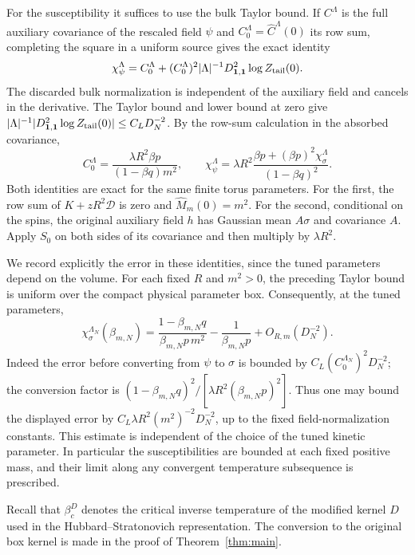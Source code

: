 \documentclass[11pt]{article}
\begin{document}
For the susceptibility it suffices to use the bulk Taylor bound.
If \(C^\Lambda\) is the full auxiliary covariance of the rescaled
field \(\psi\) and \(C_0^\Lambda=\widehat C^\Lambda(0)\) its row
sum, completing the square in a uniform source gives the exact
identity
\[
 \chi_\psi^\Lambda=C_0^\Lambda+
       (C_0^\Lambda)^2 |\Lambda|^{-1}
       D^2_{\boldsymbol1,\boldsymbol1}\log Z_{\rm tail}(0).
\]
The discarded bulk normalization is independent of the auxiliary
field and cancels in the derivative. The Taylor bound and lower
bound at zero give
\(|\Lambda|^{-1}|D^2_{\boldsymbol1,\boldsymbol1}\log Z_{\rm tail}(0)|
 \le C_L D_N^{-2}\).
By the row-sum calculation in the absorbed covariance,
\[
 C_0^\Lambda
 = \frac{\lambda R^2\beta p}{(1-\beta q)m^2},
 \qquad
 \chi_\psi^\Lambda
 =\lambda R^2\frac{\beta p+(\beta p)^2\chi_\sigma^\Lambda}
                    {(1-\beta q)^2}.
\]
Both identities are exact for the same finite torus parameters.
For the first, the row sum of \(K+zR^2\mathcal D\) is zero and
\(\widehat M_m(0)=m^2\). For the second, conditional on the spins,
the original auxiliary field \(h\) has Gaussian mean \(A\sigma\)
and covariance \(A\). Apply \(S_0\) on both sides of its covariance
and then multiply by \(\lambda R^2\).

We record explicitly the error in these identities, since the tuned
parameters depend on the volume. For each fixed \(R\) and \(m^2>0\),
the preceding Taylor bound is uniform over the compact physical
parameter box. Consequently, at the tuned parameters,
\begin{equation}\label{eq:finite-suscept-error}
 \chi_\sigma^{\Lambda_N}(\beta_{m,N})
 =\frac{1-\beta_{m,N}q}{\beta_{m,N}p\,m^2}
       -\frac1{\beta_{m,N}p}
       +O_{R,m}(D_N^{-2}).
\end{equation}
Indeed the error before converting from \(\psi\) to \(\sigma\)
is bounded by \(C_L(C_0^{\Lambda_N})^2D_N^{-2}\); the conversion
factor is
\((1-\beta_{m,N}q)^2/[\lambda R^2(\beta_{m,N}p)^2]\).
Thus one may bound the displayed error by
\(C_L\lambda R^2(m^2)^{-2}D_N^{-2}\), up to the fixed
field-normalization constants. This estimate is independent of the
choice of the tuned kinetic parameter. In particular the
susceptibilities are bounded at each fixed positive mass, and their
limit along any convergent temperature subsequence is prescribed.

Recall that \(\beta_c^D\)
denotes the critical inverse temperature of the modified kernel
\(D\) used in the Hubbard--Stratonovich representation. The
conversion to the original box kernel is made in the proof of
Theorem~\ref{thm:main}.
\end{document}
